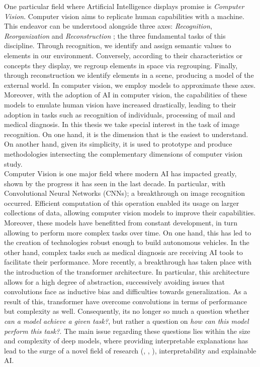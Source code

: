\noindent One particular field where Artificial Intelligence displays promise is \emph{Computer 
Vision}. Computer vision aims to replicate human capabilities with a machine. This endeavor 
can be understood alongside three axes: \emph{Recognition}, \emph{Reorganization} and 
\emph{Reconstruction} \autocite{malik2016three}; the three fundamental tasks of this discipline.
Through recognition, we identify and assign semantic values to elements in our environment. 
Conversely, according to their characteristics or concepts they display, we regroup elements 
in space via regrouping. Finally, through reconstruction we identify elements in a scene, producing 
a model of the external world. In computer vision, we employ models to approximate these axes. 
Moreover, with the adoption of AI in computer vision, the capabilities of these models to emulate 
human vision have increased drastically, leading to their adoption in tasks such as recognition of 
individuals, processing of mail and medical diagnosis. In this thesis we  take special interest in 
the task of image recognition. On one hand, it is the dimension that is the easiest to understand. 
On another hand, given its simplicity, it is used to prototype and produce methodologies 
intersecting the complementary dimensions of computer vision study.\\

\noindent Computer Vision is one major field where modern AI has impacted greatly, shown by the 
progress it has seen in the last decade. In particular, with Convolutional Neural Networks (CNNs); a 
breakthrough on image recognition occurred. Efficient computation of this 
operation enabled its usage on larger collections of data, allowing computer vision models to 
improve their capabilities. Moreover, these models have benefitted from constant development, in 
turn allowing to perform more complex tasks over time. On one hand, this has led to the creation 
of technologies robust enough to build autonomous vehicles. In the other hand, complex tasks such  
as medical diagnosis are receiving AI tools to facilitate their performance. More recently, a 
breakthrough has taken place with the introduction of the transformer architecture. 
In particular, this architecture allows for a high degree of abstraction, successively avoiding 
issues that convolutions face as inductive bias and difficulties  towards generalization. As a 
result of this, transformer have overcome convolutions in terms of performance but complexity as 
well. Consequently, its no longer so much a question whether \textit{can a model achieve a given 
task?}, but rather a question on \textit{how can this model perform this task?}. The main 
issue regarding these questions lies within the size and complexity of deep models, where 
providing interpretable explanations has lead to the surge of a novel field of research 
(\cite{li2018deep}, \cite{guidotti2018survey}, \cite{bodria2021benchmarking}), interpretability 
and explainable AI.\\

